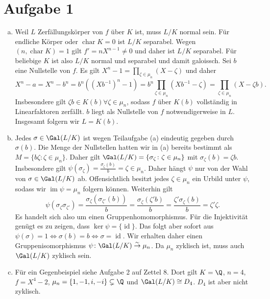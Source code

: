\documentclass{article}
\newcommand{\id}{\operatorname{id}}
\newcommand{\mychar}{\operatorname{char}}
\begin{document}
\def\headheight{25pt}
\section*{Aufgabe 1}
\begin{enumerate}[(a)]
    \item Weil $L$ Zerfällungskörper von $f$ über $K$ ist, muss $L /K$ normal sein.
          Für endliche Körper oder $\mychar K = 0$ ist $L/K$ separabel. Wegen $(n, \mychar K) = 1$ gilt $f' = n X^{n-1} \neq 0$
          und daher ist $L/K$ separabel. Für beliebige $K$ ist also $L/K$ normal und separabel und damit galoissch.
          Sei $b$ eine Nullstelle von $f$.
          Es gilt $X^n - 1 = \prod_{\zeta \in \mu_n} (X- \zeta)$ und daher
          \[
              X^n - a = X^n - b^n = b^n ((Xb^{-1})^n - 1) = b^n \prod_{\zeta \in \mu_n} (Xb^{-1} - \zeta ) = \prod_{\zeta \in \mu_n} (X - \zeta b).
          \]
          Insbesondere gilt $\zeta b \in K(b) \forall \zeta \in \mu_n$, sodass $f$ über $K(b)$ vollständig in Linearfaktoren zerfällt.
          $b$ liegt als Nullstelle von $f$ notwendigerweise in $L$.
          Insgesamt folgern wir $L = K(b)$.
    \item Jedes $\sigma \in \Gal(L/K)$ ist wegen Teilaufgabe (a) eindeutig gegeben durch $\sigma(b)$.
          Die Menge der Nullstellen hatten wir in (a) bereits bestimmt als $M = \{b\zeta \colon \zeta \in \mu_n\}$.
          Daher gilt $\Gal(L/K) = \{\sigma_\zeta \colon \zeta \in \mu_n\}$ mit $\sigma_\zeta(b) = \zeta b$.
          Insbesondere gilt $\psi(\sigma_\zeta) = \frac{\sigma_\zeta(b)}{b} = \zeta \in \mu_n$.
          Daher hängt $\psi$ nur von der Wahl von $\sigma \in \Gal(L/K)$ ab.
          Offensichtlich besitzt jedes $\zeta \in \mu_n$ ein Urbild unter $\psi$, sodass wir
          $\operatorname{im} \psi = \mu_n$ folgern können.
          Weiterhin gilt
          \[
              \psi(\sigma_\zeta \sigma_{\zeta'})
              = \frac{\sigma_\zeta(\sigma_{\zeta'}(b))}{b}
              = \frac{\sigma_\zeta(\zeta'b)}{b}
              = \frac{\zeta'\sigma_\zeta(b)}{b}
              = \zeta'\zeta.
          \]
          Es handelt sich also um einen Gruppenhomomorphismus.
          Für die Injektivität genügt es zu zeigen, dass $\ker \psi = \{\id\}$.
          Das folgt aber sofort aus $\psi(\sigma) = 1 \Leftrightarrow \sigma(b) = b \Leftrightarrow \sigma = \id$.
          Wir erhalten daher einen Gruppenisomorphismus $\psi\colon \Gal(L/K) \overset{\sim}{\to} \mu_n$.
          Da $\mu_n$ zyklisch ist, muss auch $\Gal(L/K)$ zyklisch sein.
    \item Für ein Gegenbeispiel siehe Aufgabe 2 auf Zettel 8. Dort gilt
          $K = \Q$, $n = 4$, $f = X^4 - 2$,  $\mu_n = \{1, -1, i, -i\} \subsetneq \Q$ und $\Gal(L/K) \cong D_4$.
          $D_4$ ist aber nicht zyklisch.
\end{enumerate}
\end{document}
